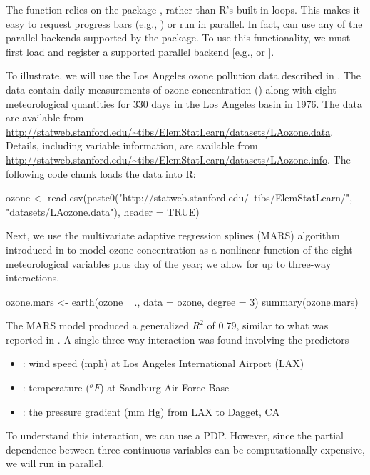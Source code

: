 The  function relies on the  package \citep{plyr-pkg}, rather than R's built-in  loops. This makes it easy to request progress bars (e.g., ) or run  in parallel. In fact,  can use any of the parallel backends supported by the  package. To use this functionality, we must first load and register a supported parallel backend [e.g.,  \citep{doMC-pkg} or  \citep{doParallel-pkg}].

To illustrate, we will use the Los Angeles ozone pollution data described in \citet{breiman-1985-estimating}. The data contain daily measurements of ozone concentration () along with eight meteorological quantities for 330 days in the Los Angeles basin in 1976. The data are available from \url{http://statweb.stanford.edu/~tibs/ElemStatLearn/datasets/LAozone.data}. Details, including variable information, are available from \url{http://statweb.stanford.edu/~tibs/ElemStatLearn/datasets/LAozone.info}. The following code chunk loads the data into R:
\begin{example}
ozone <- read.csv(paste0("http://statweb.stanford.edu/~tibs/ElemStatLearn/",
                         "datasets/LAozone.data"), header = TRUE)
\end{example}

Next, we use the multivariate adaptive regression splines (MARS) algorithm introduced in \citet{friedman-1991-mars} to model ozone concentration as a nonlinear function of the eight meteorological variables plus day of the year; we allow for up to three-way interactions.
\begin{example}
ozone.mars <- earth(ozone ~ ., data = ozone, degree = 3)
summary(ozone.mars)
\end{example}
The MARS model produced a generalized $R^2$ of $0.79$, similar to what was reported in \citet{breiman-1985-estimating}. A single three-way interaction was found involving the predictors
\begin{itemize}
  \item {}: wind speed (mph) at Los Angeles International Airport (LAX)
  \item {}: temperature ($^oF$) at Sandburg Air Force Base
  \item {}: the pressure gradient (mm Hg) from LAX to Dagget, CA
\end{itemize}
To understand this interaction, we can use a PDP. However, since the partial dependence between three continuous variables can be computationally expensive, we will run  in parallel.

